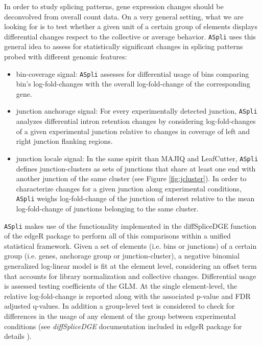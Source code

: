 \documentclass{article}
\begin{document}
In order to study splicing patterns, gene expression changes should be deconvolved from overall count data. On a very general setting, what we are looking for is to test whether a given unit of a certain group of elements displays differential changes respect to the collective or average behavior. \texttt{ASpli} uses this general idea to assess for statistically significant changes in splicing patterns probed with different genomic features:
\begin{itemize}

\item bin-coverage signal:  \texttt{ASpli} assesses for differential usage of bins comparing bin's log-fold-changes  with the overall log-fold-change of the corresponding gene.
\item junction anchorage signal: For every experimentally detected junction, \texttt{ASpli} analyzes differential intron retention changes by considering  log-fold-changes of a given experimental junction relative to changes in coverage of left and right junction flanking regions. 
\item junction locale signal: In the same spirit than MAJIQ and LeafCutter, \texttt{ASpli} defines junction-clusters as  sets of junctions that share at least one end with another junction of the same cluster (see Figure \ref{fig:jcluster}). In order to characterize changes for a given junction along experimental conditions, \texttt{ASpli} weighs log-fold-change of the junction of interest relative to the mean log-fold-change of junctions belonging to the same cluster. 

\end{itemize}

\texttt{ASpli} makes use of the functionality implemented in the diffSpliceDGE function of the edgeR package to perform all of this comparisons within a unified statistical framework. Given a set of elements (i.e. bins or junctions) of a certain group (i.e. genes, anchorage group or junction-cluster), a negative binomial generalized log-linear model is fit at the element level, considering an offset term that accounts for library normalization and collective changes. Differential usage is assessed testing coefficients of the GLM. At the single element-level, the relative log-fold-change is reported along with the associated p-value and FDR adjusted q-values. In addition a group-level test is considered to check for differences in the usage of any element of the group between experimental conditions (see {\em diffSpliceDGE} documentation included in edgeR package for details \cite{Robinson2010}).
\end{document}
